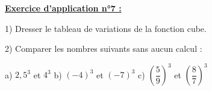 \documentclass[12pt]{article}
\begin{document}
\begin{mdframed}[
    linewidth=1pt,
    linecolor=RoyalBlue,
    innertopmargin=10pt,
    innerbottommargin=10pt
]
{\color{RoyalBlue}\textbf{\underline{Exercice d'application n°7 :}}}

\vspace{10pt}
1) Dresser le tableau de variations de la fonction cube.

\vspace{10pt}
2) Comparer les nombres suivants sans aucun calcul :

\vspace{5pt}
\hspace{1cm}a) $2,5^3$ et $4^3$ \hspace{1cm}b) $(-4)^3$ et 
$(-7)^3$ \hspace{1cm}c) $\left(\dfrac{5}{9}\right)^3$ et $\left(\dfrac{8}{7}\right)^3$

\vspace{7cm}
\end{mdframed}

\vspace{20pt}
\end{document}
